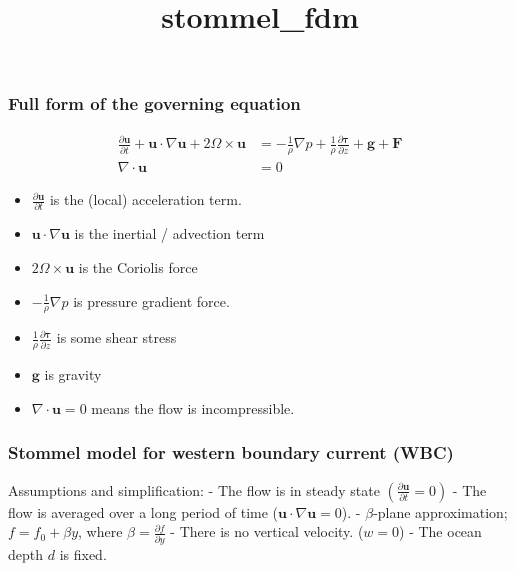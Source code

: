 \documentclass[11pt]{article}
\title{stommel\_fdm}
\begin{document}
    
    \maketitle
    
    

    
    \hypertarget{full-form-of-the-governing-equation}{%
\subsubsection{Full form of the governing
equation}\label{full-form-of-the-governing-equation}}

\begin{align*}
\frac{\partial \mathbf{u}}{\partial t} + \mathbf{u} \cdot \nabla \mathbf{u} + 2\Omega \times \mathbf{u}&= -\frac{1}{\rho} \nabla p + \frac{1}{\rho} \frac{ \partial \boldsymbol{\tau} }{\partial z} +  \mathbf{g} + \mathbf{F}\\
\nabla \cdot \mathbf{u} &= 0
\end{align*}

\begin{itemize}
\item
  \(\frac{\partial \mathbf{u}}{\partial t}\) is the (local) acceleration
  term.
\item
  \(\mathbf{u} \cdot \nabla \mathbf{u}\) is the inertial / advection
  term
\item
  \(2\Omega \times \mathbf{u}\) is the Coriolis force
\item
  \(-\frac{1}{\rho} \nabla p\) is pressure gradient force.
\item
  \(\frac{1}{\rho} \frac{ \partial \boldsymbol{\tau} }{\partial z}\) is
  some shear stress
\item
  \(\mathbf{g}\) is gravity
\item
  \(\nabla \cdot \mathbf{u} = 0\) means the flow is incompressible.
\end{itemize}

    \hypertarget{stommel-model-for-western-boundary-current-wbc}{%
\subsubsection{Stommel model for western boundary current
(WBC)}\label{stommel-model-for-western-boundary-current-wbc}}

Assumptions and simplification: - The flow is in steady state
\(\left(\frac{\partial \mathbf{u}}{\partial t} = 0 \right)\) - The flow
is averaged over a long period of time
(\(\mathbf{u} \cdot \nabla \mathbf{u} = 0\)). - \(\beta\)-plane
approximation; \(f = f_0 + \beta y\), where
\(\beta = \frac{\partial f}{\partial y}\) - There is no vertical
velocity. (\(w=0\)) - The ocean depth \(d\) is fixed.
\end{document}
